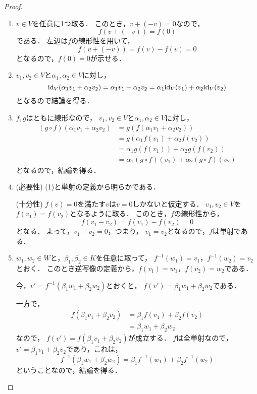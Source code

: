 \begin{proof}
    \begin{enumerate}
        \item $v \in V$を任意に1つ取る．
        このとき，$v + (-v) = 0$なので，
        \[
            f(v + (-v)) = f(0)
        \]
        である．
        左辺は$f$の線形性を用いて，
        \[
            f(v + (-v)) = f(v) - f(v) = 0
        \]
        となるので，$f(0) = 0$が示せる．
        \item $v_1,v_2 \in V$と$\alpha_1,\alpha_2 \in V$に対し，
        \[
            \mathrm{id}_V(\alpha_1 v_1 + \alpha_2 v_2)
            = \alpha_1 v_1 + \alpha_2 v_2
            = \alpha_1 \mathrm{id}_V(v_1) + \alpha_2 \mathrm{id}_V(v_2)
        \]
        となるので結論を得る．
        \item $f,g$はともに線形なので，
        $v_1,v_2 \in V$と$\alpha_1,\alpha_2 \in V$に対し，
        \[
            \begin{aligned}
                (g \circ f)(\alpha_1 v_1 + \alpha_2 v_2) %
                &= g(f(\alpha_1 v_1 + \alpha_2 v_2)) \\
                &= g(\alpha_1 f(v_1) + \alpha_2 f(v_2)) \\
                &= \alpha_1 g(f(v_1)) + \alpha_2 g(f(v_2)) \\
                &= \alpha_1 (g\circ f)(v_1) + \alpha_2 (g \circ f)(v_2)
            \end{aligned}
        \]
        となるので，結論を得る．
        \item (必要性) (1)と単射の定義から明らかである．
        
        (十分性) $f(v)=0$を満たす$v$は$v=0$しかないと仮定する．
        $v_1,v_2 \in V$を$f(v_1)=f(v_2)$となるように取る．
        このとき，$f$の線形性から，
        \[
            f(v_1 - v_2) = f(v_1) - f(v_2) = 0
        \]
        となる．
        よって，$v_1 - v_2 = 0$，つまり，
        $v_1 = v_2$となるので，$f$は単射である．
        \item $w_1,w_2 \in W$と，$\beta_1,\beta_2 \in K$を任意に取って，
        $f^{-1}(w_1) = v_1$，$f^{-1}(w_2) = v_2$とおく．
        このとき逆写像の定義から，$f(v_1) = w_1$，$f(v_2)=w_2$である．
        
        今，$v' = f^{-1}(\beta_1 w_1 + \beta_2 w_2)$とおくと，
        $f(v') = \beta_1 w_1 + \beta_2 w_2$である．
        
        一方で，
        \[
            \begin{aligned}
                f(\beta_1 v_1 + \beta_2 v_2) %
                &= \beta_1 f(v_1) + \beta_2 f(v_2) \\
                &= \beta_1 w_1 + \beta_2 w_2
            \end{aligned}
        \]
        なので，
        $f(v') = f(\beta_1 v_1 + \beta_2 v_2)$が成立する．
        $f$は全単射なので，$v' = \beta_1 v_1 + \beta_2 v_2$であり，これは，
        \[
            f^{-1}(\beta_1 w_1 + \beta_2 w_2)
            = \beta_1 f^{-1}(w_1) + \beta_2 f^{-1}(w_2)
        \]
        ということなので，結論を得る．
    \end{enumerate}
\end{proof}
